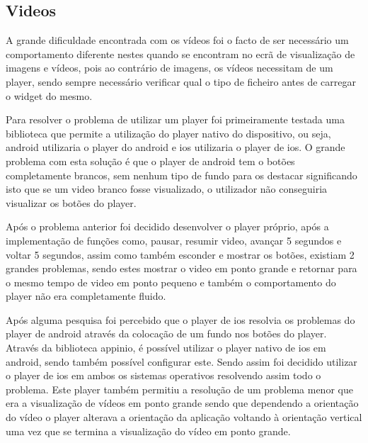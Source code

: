 \subsection{Videos}

A grande dificuldade encontrada com os vídeos foi o facto de ser necessário um comportamento diferente nestes quando se encontram no ecrã de visualização de imagens e vídeos, pois ao contrário de imagens, os vídeos necessitam de um player, sendo sempre necessário verificar qual o tipo de ficheiro antes de carregar o widget do mesmo.

Para resolver o problema de utilizar um player foi primeiramente testada uma biblioteca que permite a utilização do player nativo do dispositivo, ou seja, android utilizaria o player do android e ios utilizaria o player de ios. O grande problema com esta solução é que o player de android tem o botões completamente brancos, sem nenhum tipo de fundo para os destacar significando isto que se um video branco fosse visualizado, o utilizador não conseguiria visualizar os botões do player.

Após o problema anterior foi decidido desenvolver o player próprio, após a implementação de funções como, pausar, resumir video, avançar 5 segundos e voltar 5 segundos, assim como também esconder e mostrar os botões, existiam 2 grandes problemas, sendo estes mostrar o video em ponto grande e retornar para o mesmo tempo de video em ponto pequeno e também o comportamento do player não era completamente fluido.

Após alguma pesquisa foi percebido que o player de ios resolvia os problemas do player de android através da colocação de um fundo nos botões do player. Através da biblioteca appinio, é possível utilizar o player nativo de ios em android, sendo também possível configurar este. Sendo assim foi decidido utilizar o player de ios em ambos os sistemas operativos resolvendo assim todo o problema. Este player também permitiu a resolução de um problema menor que era a visualização de vídeos em ponto grande sendo que dependendo a orientação do vídeo o player alterava a orientação da aplicação voltando à orientação vertical uma vez que se termina a visualização do vídeo em ponto grande.